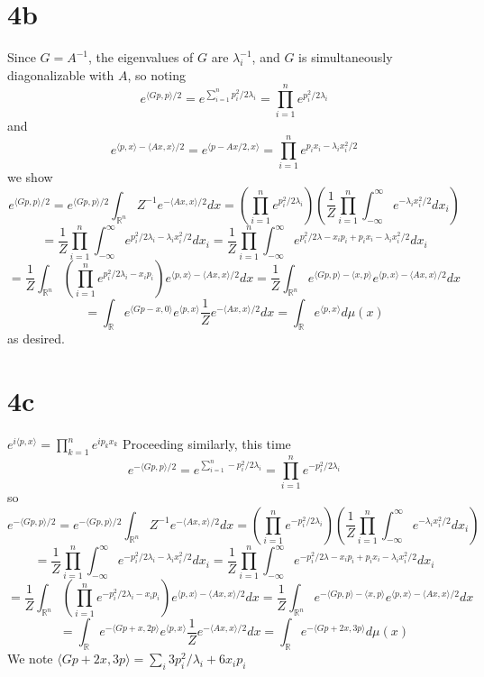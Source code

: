 \documentclass{article}
\begin{document}
\section*{4b}
Since $G=A^{-1}$, the eigenvalues of $G$ are $\lambda_{i}^{-1}$, and $G$ is simultaneously diagonalizable with $A$, so noting
\[
  e^{\langle Gp,p \rangle/2}=e^{\sum_{i=1}^{n}p_{i}^{2}/2\lambda_{i}}=\prod_{i=1}^{n}e^{p_{i}^{2}/2\lambda_{i}}
\]
and
\[
  e^{\langle p,x \rangle-\langle Ax,x \rangle/2}=e^{\langle p-Ax/2,x \rangle}=\prod_{i=1}^{n}e^{p_{i}x_{i}-\lambda_{i}x_{i}^{2}/2}
\]
we show
\[
  e^{\langle Gp,p \rangle/2}=e^{\langle Gp,p \rangle/2}\int_{\mathbb{R}^{n}}Z^{-1}e^{-\langle Ax,x \rangle/2}dx
  =\left(\prod_{i=1}^{n}e^{p_{{i}}^{2}/2\lambda_{i}}\right)
  \left( \frac{1}{Z}\prod_{i=1}^{n}\int_{-\infty}^{\infty} e^{-\lambda_{i}x_{i}^{2}/2}dx_{i}\right)
\]
\[
  =\frac{1}{Z}\prod_{i=1}^{n}\int_{-\infty}^{\infty}e^{p_{i}^{2}/2\lambda_{i}-\lambda_{i}x_{i}^{2}/2}dx_{i}
  =\frac{1}{Z}\prod_{i=1}^{n}\int_{-\infty}^{\infty}e^{p_{i}^{2}/2\lambda-x_{i}p_{i}+p_{i}x_{i}-\lambda_{i}x_{i}^{2}/2}dx_{i}
\]
\[
  =\frac{1}{Z}\int_{\mathbb{R}^{n}}\left(\prod_{i=1}^{n}e^{p_{i}^{2}/2\lambda_{i}-x_{i}p_{i}}\right)e^{\langle p,x \rangle-\langle Ax,x \rangle/2}dx
  =\frac{1}{Z}\int_{\mathbb{R}^{n}}e^{\langle Gp,p \rangle-\langle x,p\rangle}e^{\langle p,x \rangle-\langle Ax,x \rangle/2}dx
\]
\[
  =\int_{\mathbb{R}}e^{\langle Gp-x,0\rangle}e^{\langle p,x \rangle}\frac{1}{Z}e^{-\langle Ax,x \rangle/2}dx
  =\int_{\mathbb{R}}e^{\langle p,x \rangle}d\mu(x)
\]
as desired.

\section*{4c}
$e^{i\langle p,x \rangle}=\prod_{k=1}^{n}e^{ip_{k}x_{k}}$
Proceeding similarly, this time
\[
  e^{-\langle Gp,p \rangle/2}=e^{\sum_{i=1}^{n}-p_{i}^{2}/2\lambda_{i}}=\prod_{i=1}^{n}e^{-p_{i}^{2}/2\lambda_{i}}
\]
so
\[
  e^{-\langle Gp,p \rangle/2}=e^{-\langle Gp,p \rangle/2}\int_{\mathbb{R}^{n}}Z^{-1}e^{-\langle Ax,x \rangle/2}dx
  =\left(\prod_{i=1}^{n}e^{-p_{{i}}^{2}/2\lambda_{i}}\right)
  \left( \frac{1}{Z}\prod_{i=1}^{n}\int_{-\infty}^{\infty} e^{-\lambda_{i}x_{i}^{2}/2}dx_{i}\right)
\]
\[
  =\frac{1}{Z}\prod_{i=1}^{n}\int_{-\infty}^{\infty}e^{-p_{i}^{2}/2\lambda_{i}-\lambda_{i}x_{i}^{2}/2}dx_{i}
  =\frac{1}{Z}\prod_{i=1}^{n}\int_{-\infty}^{\infty}e^{-p_{i}^{2}/2\lambda-x_{i}p_{i}+p_{i}x_{i}-\lambda_{i}x_{i}^{2}/2}dx_{i}
\]
\[
  =\frac{1}{Z}\int_{\mathbb{R}^{n}}\left(\prod_{i=1}^{n}e^{-p_{i}^{2}/2\lambda_{i}-x_{i}p_{i}}\right)e^{\langle p,x \rangle-\langle Ax,x \rangle/2}dx
  =\frac{1}{Z}\int_{\mathbb{R}^{n}}e^{-\langle Gp,p \rangle-\langle x,p\rangle}e^{\langle p,x \rangle-\langle Ax,x \rangle/2}dx
\]
\[
  =\int_{\mathbb{R}}e^{-\langle Gp+x,2p\rangle}e^{\langle p,x \rangle}\frac{1}{Z}e^{-\langle Ax,x \rangle/2}dx
  =\int_{\mathbb{R}}e^{-\langle Gp+2x,3p \rangle}d\mu(x)
\]
We note $\langle Gp+2x,3p \rangle=\sum_{i}3p_{i}^{2}/\lambda_{i}+6x_{i}p_{i}$
\end{document}
